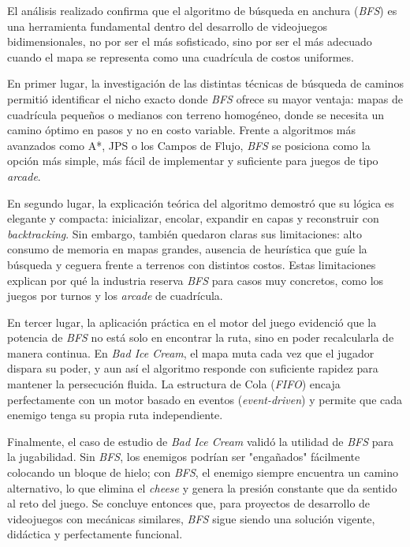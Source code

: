 \documentclass[12pt,letterpaper]{article}
\begin{document}
El análisis realizado confirma que el algoritmo de búsqueda en anchura (\textit{BFS}) es una herramienta fundamental dentro del desarrollo de videojuegos bidimensionales, no por ser el más sofisticado, sino por ser el más adecuado cuando el mapa se representa como una cuadrícula de costos uniformes.

En primer lugar, la investigación de las distintas técnicas de búsqueda de caminos permitió identificar el nicho exacto donde \textit{BFS} ofrece su mayor ventaja: mapas de cuadrícula pequeños o medianos con terreno homogéneo, donde se necesita un camino óptimo en pasos y no en costo variable. Frente a algoritmos más avanzados como A*, JPS o los Campos de Flujo, \textit{BFS} se posiciona como la opción más simple, más fácil de implementar y suficiente para juegos de tipo \textit{arcade}.

En segundo lugar, la explicación teórica del algoritmo demostró que su lógica es elegante y compacta: inicializar, encolar, expandir en capas y reconstruir con \textit{backtracking}. Sin embargo, también quedaron claras sus limitaciones: alto consumo de memoria en mapas grandes, ausencia de heurística que guíe la búsqueda y ceguera frente a terrenos con distintos costos. Estas limitaciones explican por qué la industria reserva \textit{BFS} para casos muy concretos, como los juegos por turnos y los \textit{arcade} de cuadrícula.

En tercer lugar, la aplicación práctica en el motor del juego evidenció que la potencia de \textit{BFS} no está solo en encontrar la ruta, sino en poder recalcularla de manera continua. En \textit{Bad Ice Cream}, el mapa muta cada vez que el jugador dispara su poder, y aun así el algoritmo responde con suficiente rapidez para mantener la persecución fluida. La estructura de Cola (\textit{FIFO}) encaja perfectamente con un motor basado en eventos (\textit{event-driven}) y permite que cada enemigo tenga su propia ruta independiente.

Finalmente, el caso de estudio de \textit{Bad Ice Cream} validó la utilidad de \textit{BFS} para la jugabilidad. Sin \textit{BFS}, los enemigos podrían ser "engañados" fácilmente colocando un bloque de hielo; con \textit{BFS}, el enemigo siempre encuentra un camino alternativo, lo que elimina el \textit{cheese} y genera la presión constante que da sentido al reto del juego. Se concluye entonces que, para proyectos de desarrollo de videojuegos con mecánicas similares, \textit{BFS} sigue siendo una solución vigente, didáctica y perfectamente funcional.
\end{document}
